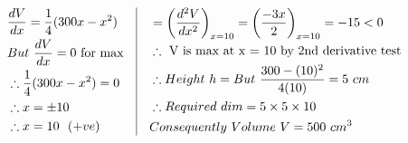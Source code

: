 \documentclass[17pt]{extarticle}
\begin{document}
\begin{fleqn}
\begin{equation} \nonumber
\begin{alignedat}{4}
& \frac{dV}{dx}=\frac{1}{4}(300x - x^2) \\
& But\  \frac{dV}{dx}= 0 \text{ for max}\\
& \therefore \frac{1}{4}(300x - x^2)=0\\
& \therefore x = \pm 10\\
& \therefore x = 10 \ \ (+ve)
\end{alignedat}
\quad
\vrule
\quad
\begin{alignedat}{4}
&= \left(\frac{d^2V}{dx^2}\right)_{x=10}=\left(\frac{-3x}{2}\right)_{x=10} = -15<0\\
& \therefore \text{ V is max at x = 10 by 2nd derivative test}\\
& \therefore Height\  h=But\  \frac{300 - (10)^2}{4(10)}= 5\ cm\\
& \therefore Required\  dim = 5 \times  5 \times 10 \\
& Consequently \ Volume\ V = 500 \ cm^3 \\
\end{alignedat}
\end{equation}


\end{fleqn}
\end{document}
